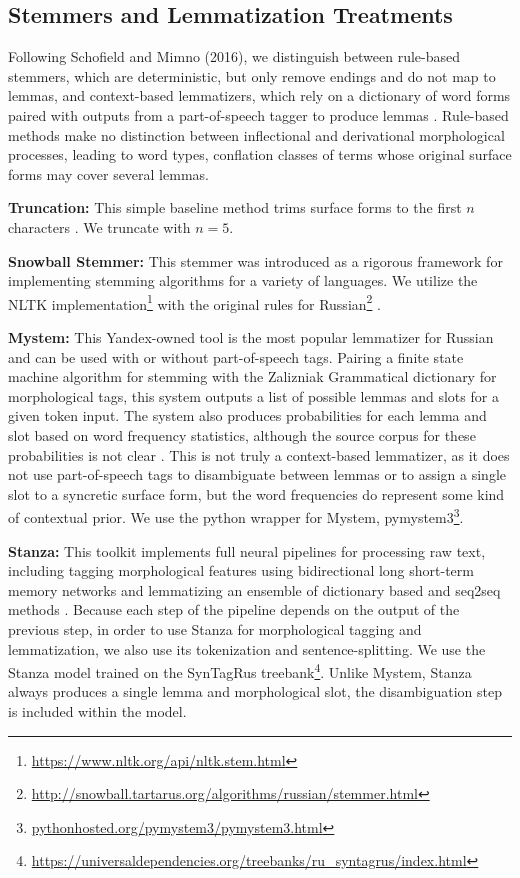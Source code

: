 \documentclass[11pt,a4paper]{article}
\begin{document}
\subsection{Stemmers and Lemmatization Treatments}
\label{sec:stemmers}
Following Schofield and Mimno (2016), we distinguish between rule-based stemmers, which are deterministic, but only remove endings and do not map to lemmas, and context-based lemmatizers, which rely on a dictionary of word forms paired with outputs from a part-of-speech tagger to produce lemmas \cite{schofield-mimno-2016-comparing,Sharoff2011ThePP}. Rule-based methods make no distinction between inflectional and derivational morphological processes, leading to word types, conflation classes of terms whose original surface forms may cover several lemmas.

\textbf{Truncation:} This simple baseline method trims surface forms to the first $n$ characters \cite{schofield-mimno-2016-comparing}. We truncate with $n=5$.

\textbf{Snowball Stemmer:} This stemmer was introduced as a rigorous framework for implementing stemming algorithms for a variety of languages. We utilize the NLTK implementation\footnote{\url{https://www.nltk.org/api/nltk.stem.html}} with the original rules for Russian\footnote{\url{http://snowball.tartarus.org/algorithms/russian/stemmer.html}} \cite{snowball}.


\textbf{Mystem:} This Yandex-owned tool is the most popular lemmatizer for Russian and can be used with or without part-of-speech tags. Pairing a finite state machine algorithm for stemming with the Zalizniak Grammatical dictionary for morphological tags, this system outputs a list of possible lemmas and slots for a given token input. The system also produces probabilities for each lemma and slot based on word frequency statistics, although the source corpus for these probabilities is not clear \cite{Segalovich2003AFM}. This is not truly a context-based lemmatizer, as it does not use part-of-speech tags to disambiguate between lemmas or to assign a single slot to a syncretic surface form, but the word frequencies do represent some kind of contextual prior. We use the python wrapper for Mystem, pymystem3\footnote{\url{pythonhosted.org/pymystem3/pymystem3.html}}.


\textbf{Stanza:} This toolkit implements full neural pipelines for processing raw text, including tagging morphological features using bidirectional long short-term memory networks and lemmatizing an ensemble of dictionary based and seq2seq methods \cite{qi2020stanza}. Because each step of the pipeline depends on the output of the previous step, in order to use Stanza for morphological tagging and lemmatization, we also use its tokenization and sentence-splitting. We use the Stanza model trained on the SynTagRus treebank\footnote{\url{https://universaldependencies.org/treebanks/ru_syntagrus/index.html}}. Unlike Mystem, Stanza always produces a single lemma and morphological slot, the disambiguation step is included within the model.
\end{document}
